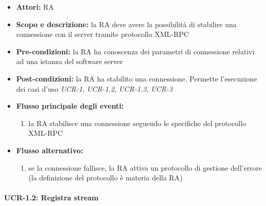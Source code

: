 \begin{itemize}
	\item \textbf{Attori:} RA
	\item \textbf{Scopo e descrizione:} la RA deve avere la possibilità di stabilire una connessione con il server tramite protocollo XML-RPC
	\item \textbf{Pre-condizioni:} la RA ha conoscenza dei parametri di connessione relativi ad una istanza del software server
	\item \textbf{Post-condizioni:} la RA ha stabilito una connessione. Permette l'esecuzione dei casi d'uso \emph{UCR-1}, \emph{UCR-1.2}, \emph{UCR-1.3}, \emph{UCR-3}
	\item \textbf{Flusso principale degli eventi:}
		\begin{enumerate}
			\item la RA stabilisce una connessione seguendo le specifiche del protocollo XML-RPC
		\end{enumerate}
	\item \textbf{Flusso alternativo:}
		\begin{enumerate}
			\item se la connessione fallisce, la RA attiva un protocollo di gestione dell'errore (la definizione del protocollo è materia della RA)
		\end{enumerate}
\end{itemize}


\paragraph{UCR-1.2: Registra stream}

